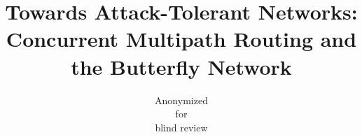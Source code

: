 \documentclass[sigconf]{acmart}
\begin{document}
\title{
    Towards Attack-Tolerant Networks:
    Concurrent Multipath Routing and the Butterfly Network}


\author{Anonymized\\for\\blind review}

\renewcommand{\shortauthors}{Anonymized for blind review}
\end{document}
